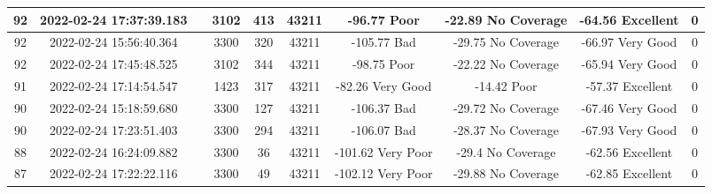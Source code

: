 \begin{longtable*}{|c|c|c|c|c|c|c|c|c|c|}
92&2022-02-24 17:37:39.183&&3102&413&43211& -96.77    Poor        & -22.89    No Coverage & -64.56    Excellent   & 0\\\hline
{}92&2022-02-24 15:56:40.364&&3300&320&43211& -105.77   Bad         & -29.75    No Coverage & -66.97    Very Good   & 0\\\hline
{}92&2022-02-24 17:45:48.525&&3102&344&43211& -98.75    Poor        & -22.22    No Coverage & -65.94    Very Good   & 0\\\hline
{}91&2022-02-24 17:14:54.547&&1423&317&43211& -82.26    Very Good   & -14.42    Poor        & -57.37    Excellent   & 0\\\hline
{}90&2022-02-24 15:18:59.680&&3300&127&43211& -106.37   Bad         & -29.72    No Coverage & -67.46    Very Good   & 0\\\hline
{}90&2022-02-24 17:23:51.403&&3300&294&43211& -106.07   Bad         & -28.37    No Coverage & -67.93    Very Good   & 0\\\hline
{}88&2022-02-24 16:24:09.882&&3300&36&43211& -101.62   Very Poor   & -29.4     No Coverage & -62.56    Excellent   & 0\\\hline
{}87&2022-02-24 17:22:22.116&&3300&49&43211& -102.12   Very Poor   & -29.88    No Coverage & -62.85    Excellent   & 0\\\hline

\end{longtable*}
